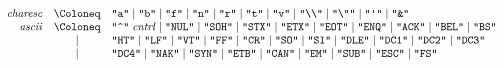 \begin{align*}
\begin{array}{rcl}
    \\
    \mathit{charesc}
    & \Coloneq & \text{\texttt{\textquotedbl a\textquotedbl}}
    \mid \text{\texttt{\textquotedbl b\textquotedbl}}
    \mid \text{\texttt{\textquotedbl f\textquotedbl}}
    \mid \text{\texttt{\textquotedbl n\textquotedbl}}
    \mid \text{\texttt{\textquotedbl r\textquotedbl}}
    \mid \text{\texttt{\textquotedbl t\textquotedbl}}
    \mid \text{\texttt{\textquotedbl v\textquotedbl}}
    \mid \text{\texttt{\textquotedbl\textbackslash\textbackslash\textquotedbl}}
    \mid \text{\texttt{\textquotedbl\textbackslash\textquotedbl\textquotedbl}}
    \mid \text{\texttt{\textquotedbl\textquotesingle\textquotedbl}}
    \mid \text{\texttt{\textquotedbl\&\textquotedbl}}
    \\
    \mathit{ascii}
    & \Coloneq & \text{\texttt{\textquotedbl\textasciicircum\textquotedbl}}\; \mathit{cntrl}
    \mid \text{\texttt{\textquotedbl NUL\textquotedbl}}
    \mid \text{\texttt{\textquotedbl SOH\textquotedbl}}
    \mid \text{\texttt{\textquotedbl STX\textquotedbl}}
    \mid \text{\texttt{\textquotedbl ETX\textquotedbl}}
    \mid \text{\texttt{\textquotedbl EOT\textquotedbl}}
    \mid \text{\texttt{\textquotedbl ENQ\textquotedbl}}
    \mid \text{\texttt{\textquotedbl ACK\textquotedbl}}
    \mid \text{\texttt{\textquotedbl BEL\textquotedbl}}
    \mid \text{\texttt{\textquotedbl BS\textquotedbl}}
    \\
    & \mid & \text{\texttt{\textquotedbl HT\textquotedbl}}
    \mid \text{\texttt{\textquotedbl LF\textquotedbl}}
    \mid \text{\texttt{\textquotedbl VT\textquotedbl}}
    \mid \text{\texttt{\textquotedbl FF\textquotedbl}}
    \mid \text{\texttt{\textquotedbl CR\textquotedbl}}
    \mid \text{\texttt{\textquotedbl SO\textquotedbl}}
    \mid \text{\texttt{\textquotedbl SI\textquotedbl}}
    \mid \text{\texttt{\textquotedbl DLE\textquotedbl}}
    \mid \text{\texttt{\textquotedbl DC1\textquotedbl}}
    \mid \text{\texttt{\textquotedbl DC2\textquotedbl}}
    \mid \text{\texttt{\textquotedbl DC3\textquotedbl}}
    \\
    & \mid & \text{\texttt{\textquotedbl DC4\textquotedbl}}
    \mid \text{\texttt{\textquotedbl NAK\textquotedbl}}
    \mid \text{\texttt{\textquotedbl SYN\textquotedbl}}
    \mid \text{\texttt{\textquotedbl ETB\textquotedbl}}
    \mid \text{\texttt{\textquotedbl CAN\textquotedbl}}
    \mid \text{\texttt{\textquotedbl EM\textquotedbl}}
    \mid \text{\texttt{\textquotedbl SUB\textquotedbl}}
    \mid \text{\texttt{\textquotedbl ESC\textquotedbl}}
    \mid \text{\texttt{\textquotedbl FS\textquotedbl}}

\end{array}
\end{align*}
